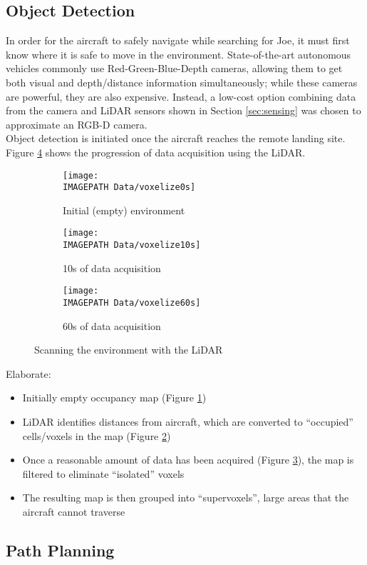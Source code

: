 \subsection{Object Detection}
In order for the aircraft to safely navigate while searching for Joe, it must first know where it is safe to move in the environment. State-of-the-art autonomous vehicles commonly use Red-Green-Blue-Depth cameras, allowing them to get both visual and depth/distance information simultaneously; while these cameras are powerful, they are also expensive. Instead, a low-cost option combining data from the camera and LiDAR sensors shown in Section \ref{sec:sensing} was chosen to approximate an RGB-D camera.\\

Object detection is initiated once the aircraft reaches the remote landing site. Figure \ref{fig:scan} shows the progression of data acquisition using the LiDAR.\\

\begin{figure}
	\centering
	\begin{subfigure}[b]{0.50\textwidth}
		\texttt{[image: \\IMAGEPATH Data/voxelize0s]}
		\caption{Initial (empty) environment}
		\label{fig:scaninit}
	\end{subfigure}
	
	\begin{subfigure}[b]{0.50\textwidth}
		\texttt{[image: \\IMAGEPATH Data/voxelize10s]}
		\caption{10s of data acquisition}
		\label{fig:scanten}
	\end{subfigure}
	
	\begin{subfigure}[b]{0.50\textwidth}
		\texttt{[image: \\IMAGEPATH Data/voxelize60s]}
		\caption{60s of data acquisition}
		\label{fig:scanminute}
	\end{subfigure}
	\caption{Scanning the environment with the LiDAR}
	\label{fig:scan}
\end{figure}

Elaborate:
\begin{itemize}
	\item Initially empty occupancy map (Figure \ref{fig:scaninit})
	\item LiDAR identifies distances from aircraft, which are converted to ``occupied'' cells/voxels in the map (Figure \ref{fig:scanten})
	\item Once a reasonable amount of data has been acquired (Figure \ref{fig:scanminute}), the map is filtered to eliminate ``isolated'' voxels
	\item The resulting map is then grouped into ``supervoxels'', large areas that the aircraft cannot traverse
\end{itemize}

\subsection{Path Planning}
